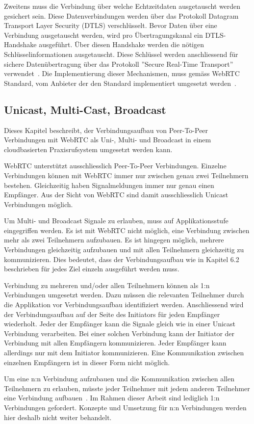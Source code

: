 Zweitens muss die Verbindung über welche Echtzeitdaten ausgetauscht werden gesichert sein.
Diese Datenverbindungen werden über das Protokoll Datagram Transport Layer Security (DTLS) verschlüsselt.
Bevor Daten über eine Verbindung ausgetauscht werden, wird pro Übertragungskanal ein DTLS-Handshake ausgeführt.
Über diesen Handshake werden die nötigen Schlüsselinformationen ausgetauscht.
Diese Schlüssel werden anschliessend für sichere Datenübertragung über das Protokoll ''Secure Real-Time Transport'' verwendet~\cite{rfc_8827_webRTC_SecurityArchitecture}.
Die Implementierung dieser Mechanismen, muss gemäss WebRTC Standard, vom Anbieter der den Standard implementiert umgesetzt werden~\cite{webrtc_spec}.

\subsection{Unicast, Multi-Cast, Broadcast}

Dieses Kapitel beschreibt, der Verbindungsaufbau von Peer-To-Peer Verbindungen mit WebRTC als Uni-, Multi- und Broadcast in einem cloudbasierten Praxisrufsystem umgesetzt werden kann.

WebRTC unterstützt ausschliesslich Peer-To-Peer Verbindungen.
Einzelne Verbindungen können mit WebRTC immer nur zwischen genau zwei Teilnehmern bestehen.
Gleichzeitig haben Signalmeldungen immer nur genau einen Empfänger.
Aus der Sicht von WebRTC sind damit ausschliesslich Unicast Verbindungen möglich.

Um Multi- und Broadcast Signale zu erlauben, muss auf Applikationsstufe eingegriffen werden.
Es ist mit WebRTC nicht möglich, eine Verbindung zwischen mehr als zwei Teilnehmern aufzubauen.
Es ist hingegen möglich, mehrere Verbindungen gleichzeitig aufzubauen und mit allen Teilnehmern gleichzeitig zu kommunizieren.
Dies bedeutet, dass der Verbindungsaufbau wie in Kapitel 6.2 beschrieben für jedes Ziel einzeln ausgeführt werden muss.

Verbindung zu mehreren und/oder allen Teilnehmern können als 1:n Verbindungen umgesetzt werden.
Dazu müssen die relevanten Teilnehmer durch die Applikation vor Verbindungsaufbau identifiziert werden.
Anschliessend wird der Verbindungsaufbau auf der Seite des Initiators für jeden Empfänger wiederholt.
Jeder der Empfänger kann die Signale gleich wie in einer Unicast Verbindung verarbeiten.
Bei einer solchen Verbindung kann der Initiator der Verbindung mit allen Empfängern kommunizieren.
Jeder Empfänger kann allerdings nur mit dem Initiator kommunizieren.
Eine Kommunikation zwischen einzelnen Empfängern ist in dieser Form nicht möglich.

Um eine n:n Verbindung aufzubauen und die Kommunikation zwischen allen Teilnehmern zu erlauben, müsste jeder Teilnehmer mit jedem anderen Teilnehmer eine Verbindung aufbauen~\cite{webrtc_mesh}.
Im Rahmen dieser Arbeit sind lediglich 1:n Verbindungen gefordert.
Konzepte und Umsetzung für n:n Verbindungen werden hier deshalb nicht weiter behandelt.


\clearpage
